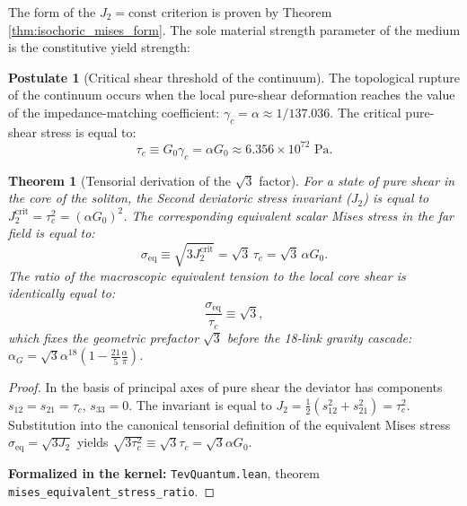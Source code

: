 \documentclass[11pt,a4paper]{article}
\newtheorem{theorem}{Theorem}
\theoremstyle{definition}
\newtheorem{postulate}{Postulate}
\theoremstyle{remark}
\begin{document}
The form of the $J_2 = \text{const}$ criterion is proven by Theorem \ref{thm:isochoric_mises_form}. The sole material strength parameter of the medium is the constitutive yield strength:

\begin{postulate}[Critical shear threshold of the continuum]
\label{post:shear_yield_threshold}
The topological rupture of the continuum occurs when the local pure-shear deformation reaches the value of the impedance-matching coefficient: $\gamma_c = \alpha \approx 1/137.036$. The critical pure-shear stress is equal to:
\begin{equation}
    \tau_c \equiv G_0 \gamma_c = \alpha G_0 \approx 6.356 \times 10^{72}\text{ Pa}.
    \label{eq:critical_shear_stress_def}
\end{equation}
\end{postulate}

\begin{theorem}[Tensorial derivation of the $\sqrt{3}$ factor]
\label{thm:mises_equivalent_stress_root3}
For a state of pure shear in the core of the soliton, the Second deviatoric stress invariant ($J_2$) is equal to $J_2^{\mathrm{crit}} = \tau_c^2 = (\alpha G_0)^2$. The corresponding equivalent scalar Mises stress in the far field is equal to:
\begin{equation}
    \sigma_{\mathrm{eq}} \equiv \sqrt{3 J_2^{\mathrm{crit}}} = \sqrt{3} \, \tau_c = \sqrt{3} \, \alpha G_0.
    \label{eq:mises_equivalent_stress_exact}
\end{equation}
The ratio of the macroscopic equivalent tension to the local core shear is identically equal to:
\begin{equation}
    \frac{\sigma_{\mathrm{eq}}}{\tau_c} \equiv \sqrt{3},
\end{equation}
which fixes the geometric prefactor $\sqrt{3}$ before the 18-link gravity cascade: $\alpha_G = \sqrt{3} \alpha^{18} (1 - \frac{21}{5}\frac{\alpha}{\pi})$.
\end{theorem}
\begin{proof}
In the basis of principal axes of pure shear the deviator has components $s_{12} = s_{21} = \tau_c$, $s_{33} = 0$. The invariant is equal to $J_2 = \frac{1}{2}(s_{12}^2 + s_{21}^2) = \tau_c^2$. Substitution into the canonical tensorial definition of the equivalent Mises stress $\sigma_{\mathrm{eq}} = \sqrt{3 J_2}$ yields $\sqrt{3 \tau_c^2} \equiv \sqrt{3}\tau_c = \sqrt{3}\alpha G_0$.

\noindent\small\textbf{Formalized in the kernel:} \texttt{TevQuantum.lean}, theorem \texttt{mises_equivalent_stress_ratio}.
\end{proof}
\end{document}

